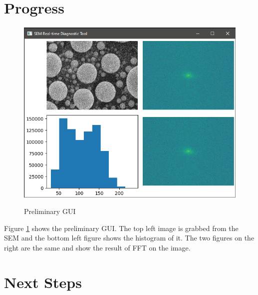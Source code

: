 \documentclass[12pt,a4paper]{article}
\begin{document}
\section{Progress}
\paragraph{}
\begin{figure}[h!]
  \centering
  \includegraphics[scale=0.8]{"GUI Screenshot"}
  \label{fig:GUI Screenshot}
  \caption{Preliminary GUI}
\end{figure}
Figure \ref{fig:GUI Screenshot} shows the preliminary GUI. The top left image is grabbed from the SEM and the bottom left figure shows the histogram of it. The two figures on the right are the same and show the result of FFT on the image.

\section{Next Steps}
\end{document}
